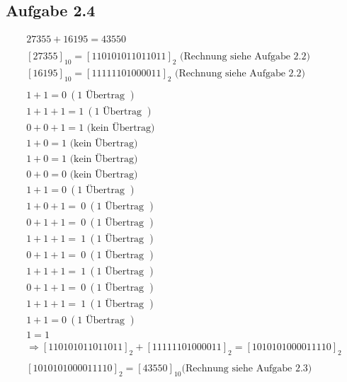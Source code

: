 \documentclass[12pt,a4paper]{article}
\begin{document}
\subsection*{Aufgabe 2.4}
\begin{align*}
27355 + 16195 = 43550 \\
\\
[27355]_{10} = [110101011011011]_{2} \textrm{ (Rechnung siehe Aufgabe 2.2)} \\
[16195]_{10} = [11111101000011]_{2} \textrm{ (Rechnung siehe Aufgabe 2.2)} \\
\\
1 + 1 = 0 ~(1 \textrm{ Übertrag }) \\
1 + 1 + 1 = 1 ~(1 \textrm{ Übertrag }) \\
0 + 0 + 1 = 1 \textrm{ (kein Übertrag) } \\
1 + 0 = 1 \textrm{ (kein Übertrag) } \\
1 + 0 = 1 \textrm{ (kein Übertrag) } \\
0 + 0 = 0 \textrm{ (kein Übertrag) } \\
1 + 1 = 0 ~(1 \textrm{ Übertrag }) \\
1 + 0 + 1 = ~0 ~(1 \textrm{ Übertrag }) \\
0 + 1 + 1 = ~0 ~ (1 \textrm{ Übertrag }) \\
1 + 1 + 1 = ~1 ~(1 \textrm{ Übertrag }) \\
0 + 1 + 1 = ~0~ (1 \textrm{ Übertrag }) \\
1 + 1 + 1 = ~1~ (1 \textrm{ Übertrag }) \\
0 + 1 + 1 = ~0~ (1 \textrm{ Übertrag }) \\
1 + 1 + 1 = ~1~ (1 \textrm{ Übertrag }) \\
1 + 1 = 0 ~(1 \textrm{ Übertrag }) \\
1 = 1 \\
\Rightarrow [110101011011011]_{2} + [11111101000011]_{2} = [1010101000011110]_{2} \\
\\
[1010101000011110]_{2} = [43550]_{10} \textrm{(Rechnung siehe Aufgabe 2.3)}
\end{align*}
\end{document}
